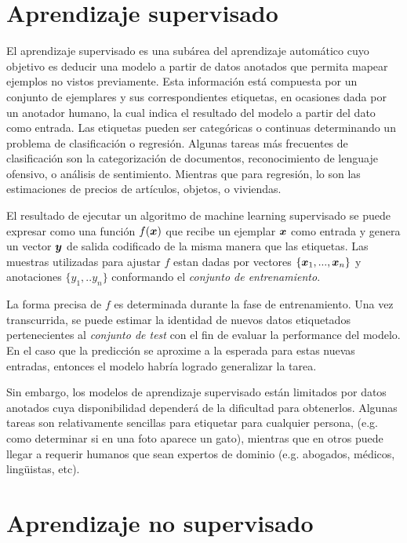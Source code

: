 \section{Aprendizaje supervisado}

El aprendizaje supervisado es una subárea del aprendizaje automático cuyo
objetivo es deducir una modelo a partir de datos anotados que permita mapear
ejemplos no vistos previamente. Esta información está compuesta por un conjunto
de ejemplares y sus correspondientes etiquetas, en ocasiones dada por un
anotador humano, la cual indica el resultado del modelo a partir del dato como
entrada. Las etiquetas pueden ser categóricas o continuas determinando un
problema de clasificación o regresión. Algunas tareas más frecuentes de
clasificación son la categorización de documentos, reconocimiento de lenguaje
ofensivo, o análisis de sentimiento. Mientras que para regresión, lo son las
estimaciones de precios de artículos, objetos, o viviendas.

El resultado de ejecutar un algoritmo de machine learning supervisado se puede
expresar como una función $f(\boldsymbol{x})$ que recibe un ejemplar $\boldsymbol{x}$ como
entrada y genera un vector $\boldsymbol{y}$ de salida codificado de la misma manera
que las etiquetas. Las muestras utilizadas para ajustar $f$ estan dadas por
vectores $\{\boldsymbol{x}_1, ..., \boldsymbol{x}_n\}$ y anotaciones $\{y_1, .. y_n\}$
conformando el \emph{conjunto de entrenamiento}.

La forma precisa de $f$ es determinada durante la fase de entrenamiento. Una vez
transcurrida, se puede estimar la identidad de nuevos datos etiquetados
pertenecientes al \emph{conjunto de test} con el fin de evaluar la performance
del modelo. En el caso que la predicción se aproxime a la esperada para estas
nuevas entradas, entonces el modelo habría logrado generalizar la tarea.

Sin embargo, los modelos de aprendizaje supervisado están limitados por datos
anotados cuya disponibilidad dependerá de la dificultad para obtenerlos. Algunas
tareas son relativamente sencillas para etiquetar para cualquier persona, (e.g.
como determinar si en una foto aparece un gato), mientras que en otros puede
llegar a requerir humanos que sean expertos de dominio (e.g. abogados, médicos,
lingüistas, etc).

\section{Aprendizaje no supervisado}

